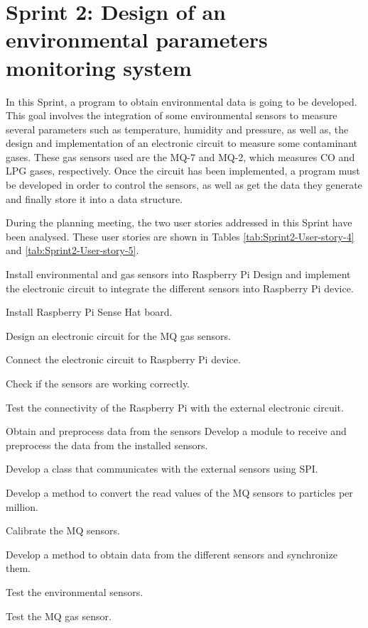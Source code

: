 \section{Sprint 2: Design of an environmental parameters monitoring system}
In this Sprint, a program to obtain environmental data is going to be developed. This goal involves the integration of some environmental sensors to measure several parameters such as temperature, humidity and pressure, as well as, the design and implementation of an electronic circuit to measure some contaminant gases. These gas sensors used are the MQ-7 and MQ-2, which measures CO and LPG gases, respectively. Once the circuit has been implemented, a program must be developed in order to control the sensors, as well as get the data they generate and finally store it into a data structure.

During the planning meeting, the two user stories addressed in this Sprint have been analysed. These user stories are shown in Tables \ref{tab:Sprint2-User-story-4} and \ref{tab:Sprint2-User-story-5}.

{Install environmental and gas sensors into Raspberry Pi}
{Design and implement the electronic circuit to integrate the different sensors into Raspberry Pi device.}
{	\item Install Raspberry Pi Sense Hat board.
	\item Design an electronic circuit for the MQ gas sensors.
	\item Connect the electronic circuit to Raspberry Pi device.
}{	\item Check if the sensors are working correctly.
	\item Test the connectivity of the Raspberry Pi with the external electronic circuit.
}

{Obtain and preprocess data from the sensors}
{Develop a module to receive and preprocess the data from the installed sensors.}
{	\item Develop a class that communicates with the external sensors using \ac{SPI}.
	\item Develop a method to convert the read values of the MQ sensors to particles per million.
	\item Calibrate the MQ sensors.
	\item Develop a method to obtain data from the different sensors and synchronize them.
}{	\item Test the environmental sensors.
	\item Test the MQ gas sensor.
}


